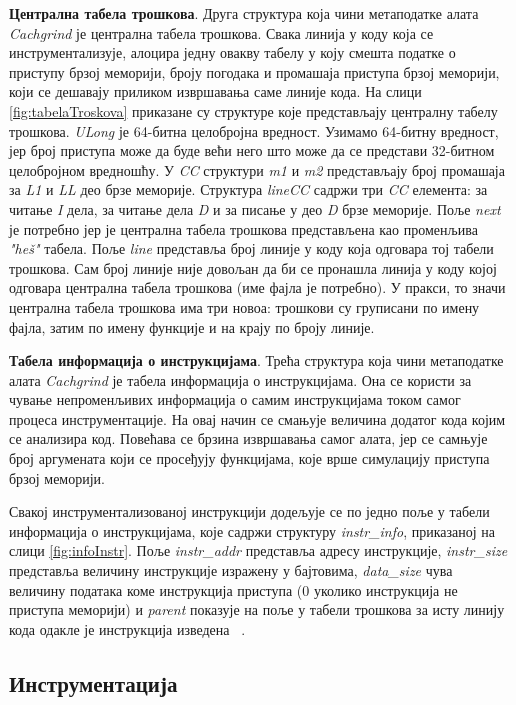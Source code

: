 \documentclass[12pt,oneside]{memoir}
\begin{document}
\indent \textbf{Централна табела трошкова}. Друга структура која чини метаподатке алата \textit{Cachgrind} је централна табела трошкова. Свака линија у коду која се инструментализује, алоцира једну овакву табелу у коју смешта податке о приступу брзој меморији, броју погодака и промашаја приступа брзој меморији, који се дешавају приликом извршавања саме линије кода. На слици \ref{fig:tabelaTroskova} приказане су структуре које представљају централну табелу трошкова. \textit{ULong} је 64-битна целобројна вредност. Узимамо 64-битну вредност, јер број приступа може да буде већи него што може да се представи 32-битном целобројном вредношћу. У \textit{CC} структури \textit{m1} и \textit{m2} представљају број промашаја за \textit{L1} и \textit{LL} део брзе меморије. Структура \textit{lineCC} садржи три \textit{CC} елемента: за читање \textit{I} дела, за читање дела \textit{D} и за писање у део \textit{D} брзе меморије. Поље \textit{next} је потребно јер је централна табела трошкова представљена као променљива \textit{"heš"} табела. Поље \textit{line} представља број линије у коду која одговара тој табели трошкова. Сам број линије није довољан да би се пронашла линија у коду којој одговара централна табела трошкова (име фајла је потребно). У пракси, то значи централна табела трошкова има три новоа: трошкови су груписани по имену фајла, затим по имену функције и на крају по броју линије.


\indent \textbf{Табела информација о инструкцијама}. Трећа структура која чини метаподатке алата \textit{Cachgrind} је табела информација о инструкцијама. Она се користи за чување непроменљивих информација о самим инструкцијама током самог процеса инструментације. На овај начин се смањује величина додатог кода којим се анализира код. Повећава се брзина извршавања самог алата, јер се самњује број аргумената који се просеђују функцијама, које врше симулацију приступа брзој меморији.


\indent Свакој инструментализованој инструкцији додељује се по једно поље у табели информација о инструкцијама, које садржи структуру \textit{instr\_info}, приказаној на слици \ref{fig:infoInstr}. Поље \textit{instr\_addr} представља адресу инструкције,  \textit{instr\_size} представља величину инструкције изражену у бајтовима, \textit{data\_size} чува величину података коме инструкција приступа (0 уколико инструкција не приступа меморији) и \textit{parent} показује на поље у табели трошкова за исту линију кода одакле је инструкција изведена ~\cite{cachegrindRef}.

\subsection{Инструментација}
\end{document}
